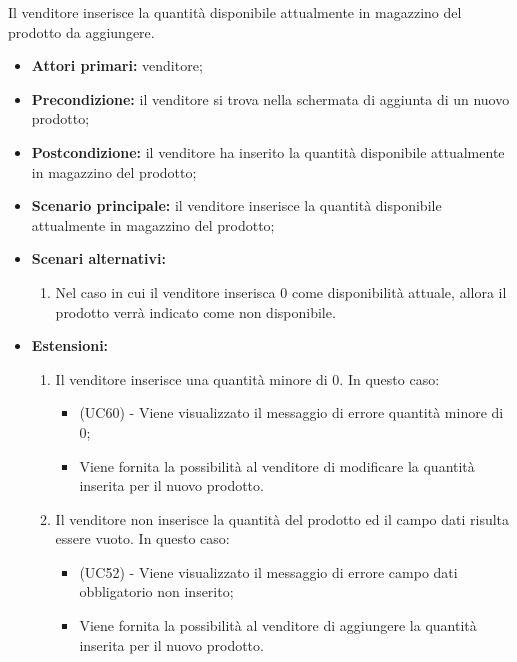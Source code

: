 Il venditore inserisce la quantità disponibile attualmente in magazzino del prodotto da aggiungere.
\begin{itemize}
    \item \textbf{Attori primari:} venditore;
    \item \textbf{Precondizione:} il venditore si trova nella schermata di aggiunta di un nuovo prodotto;
    \item \textbf{Postcondizione:} il venditore ha inserito la quantità disponibile attualmente in magazzino del prodotto;
    \item \textbf{Scenario principale:} il venditore inserisce la quantità disponibile attualmente in magazzino del prodotto;
    \item \textbf{Scenari alternativi:}
    \begin{enumerate}[label=\lett]
    	\item Nel caso in cui il venditore inserisca 0 come disponibilità attuale, allora il prodotto verrà indicato come non disponibile.
    \end{enumerate}
    \item \textbf{Estensioni:}
    \begin{enumerate}[label=\lett]
    	\item Il venditore inserisce una quantità minore di 0. In questo caso:
    	\begin{itemize}
    		\item (UC60) - Viene visualizzato il messaggio di errore quantità minore di 0;
    		\item Viene fornita la possibilità al venditore di modificare la quantità inserita per il nuovo prodotto.
    	\end{itemize}
    	\item Il venditore non inserisce la quantità del prodotto ed il campo dati risulta essere vuoto. In questo caso:
    	\begin{itemize}
    		\item (UC52) - Viene visualizzato il messaggio di errore campo dati obbligatorio non inserito;
    		\item Viene fornita la possibilità al venditore di aggiungere la quantità inserita per il nuovo prodotto.
    	\end{itemize}
    \end{enumerate}
\end{itemize}

